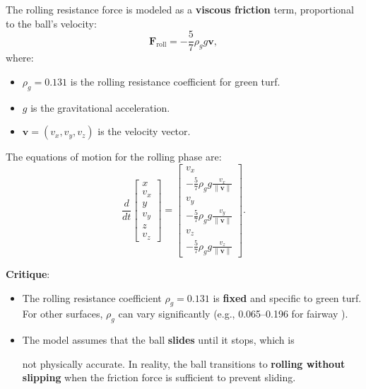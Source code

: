 \documentclass[10pt,a4paper]{report}
\begin{document}
The rolling resistance force is modeled as a \textbf{viscous friction} term, proportional to the ball's velocity:
\[
\mathbf{F}_{\text{roll}} = -\frac{5}{7} \rho_g g \mathbf{v},
\]
where:
\begin{itemize}
    \item $\rho_g = 0.131$ is the rolling resistance coefficient for green turf.
    \item $g$ is the gravitational acceleration.
    \item $\mathbf{v} = (v_x, v_y, v_z)$ is the velocity vector.
\end{itemize}

The equations of motion for the rolling phase are:
\[
\frac{d}{dt}
\begin{bmatrix}
x \\ v_x \\ y \\ v_y \\ z \\ v_z
\end{bmatrix}
=
\begin{bmatrix}
v_x \\
-\frac{5}{7} \rho_g g \frac{v_x}{\|\mathbf{v}\|} \\
v_y \\
-\frac{5}{7} \rho_g g \frac{v_y}{\|\mathbf{v}\|} \\
v_z \\
-\frac{5}{7} \rho_g g \frac{v_z}{\|\mathbf{v}\|}
\end{bmatrix}.
\]

\textbf{Critique}:
\begin{itemize}
    \item The rolling resistance coefficient $\rho_g = 0.131$ is 
    \textbf{fixed} and specific to green turf. For other surfaces, 
    $\rho_g$ can vary significantly (e.g., 0.065--0.196 for fairway \cite{PA07}).
    \item The model assumes that the ball \textbf{slides} until it stops, which is 
    
    not physically accurate. In reality, the ball transitions to \textbf{rolling without slipping} 
    when the friction force is sufficient to prevent sliding.
\end{itemize}
\end{document}
